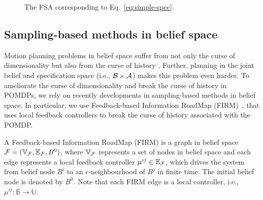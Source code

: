 \documentclass[conference]{IEEEtran}
\begin{document}
\begin{figure}[h!]
\caption{The FSA corresponding to Eq.~\eqref{eq:simple-spec}.}
\label{fig:simple-spec-fsa}
\end{figure}

\let\goal\undefined
\let\obst\undefined

\subsection{Sampling-based methods in belief space}
\label{sec:FIRM}
Motion planning problems in belief space suffer from not only the curse of dimensionality but also from the curse of history \cite{Pineau03a}. Further, planning in the joint belief and specification space (i.e., $\mathcal{B} \times \mathcal{A}$) makes this problem even harder. To ameliorate the curse of dimensionality and break the curse of history in POMDPs, we rely on recently developments in sampling-based methods in belief space. In particular, we use Feedback-based Information RoadMap (FIRM)~\cite{Agha14}, that uses local feedback controllers to break the curse of history associated with the POMDP. 

\begin{definition}[FIRM]
A Feedback-based Information RoadMap (FIRM) is a graph in belief space $\mathcal{F} = (\mathbb{V}_{\mathcal{F}}, \mathbb{E}_{\mathcal{F}}, B^0)$, where $\mathbb{V}_{\mathcal{F}}$ represents a set of nodes in belief space and each edge represents a local feedback controller $\mu^{ij} \in \mathbb{E}_{\mathcal{F}}$, which drives the system from belief node $B^i$ to an $\epsilon$-neighbourhood of $B^j$ in finite time. The initial belief node is denoted by $B^0$. Note that each FIRM edge is a local controller, i.e., $\mu^{ij}:\mathbb{B}\rightarrow\mathbb{U}$.
\end{definition}
\end{document}
